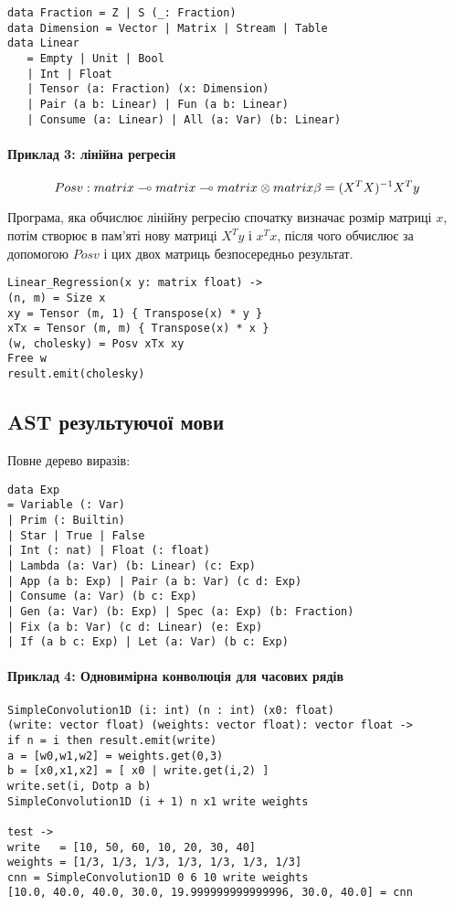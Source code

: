 \documentclass{article}
\begin{document}
\begin{lstlisting}
data Fraction = Z | S (_: Fraction)
data Dimension = Vector | Matrix | Stream | Table
data Linear
   = Empty | Unit | Bool
   | Int | Float
   | Tensor (a: Fraction) (x: Dimension)
   | Pair (a b: Linear) | Fun (a b: Linear)
   | Consume (a: Linear) | All (a: Var) (b: Linear)
\end{lstlisting}

\paragraph{Приклад 3: лінійна регресія}
$$
  Posv : matrix \multimap matrix \multimap matrix \otimes matrix \\
  \beta = (X^TX)^{-1}X^Ty
$$

Програма, яка обчислює лінійну регресію спочатку визначає розмір матриці $x$,
потім створює в пам'яті нову матриці $X^T y$ і $x^Tx$,
після чого обчислює за допомогою $Posv$ і цих двох матриць безпосередньо результат.

\begin{lstlisting}
Linear_Regression(x y: matrix float) ->
(n, m) = Size x
xy = Tensor (m, 1) { Transpose(x) * y }
xTx = Tensor (m, m) { Transpose(x) * x }
(w, cholesky) = Posv xTx xy
Free w
result.emit(cholesky)
\end{lstlisting}

\subsection{AST результуючої мови}
Повне дерево виразів:
\begin{lstlisting}
data Exp
= Variable (: Var)
| Prim (: Builtin)
| Star | True | False
| Int (: nat) | Float (: float)
| Lambda (a: Var) (b: Linear) (c: Exp)
| App (a b: Exp) | Pair (a b: Var) (c d: Exp)
| Consume (a: Var) (b c: Exp)
| Gen (a: Var) (b: Exp) | Spec (a: Exp) (b: Fraction)
| Fix (a b: Var) (c d: Linear) (e: Exp)
| If (a b c: Exp) | Let (a: Var) (b c: Exp)
\end{lstlisting}

\paragraph{Приклад 4: Одновимірна конволюція для часових рядів}
\begin{lstlisting}
SimpleConvolution1D (i: int) (n : int) (x0: float)
(write: vector float) (weights: vector float): vector float ->
if n = i then result.emit(write)
a = [w0,w1,w2] = weights.get(0,3)
b = [x0,x1,x2] = [ x0 | write.get(i,2) ]
write.set(i, Dotp a b)
SimpleConvolution1D (i + 1) n x1 write weights

test ->
write   = [10, 50, 60, 10, 20, 30, 40]
weights = [1/3, 1/3, 1/3, 1/3, 1/3, 1/3, 1/3]
cnn = SimpleConvolution1D 0 6 10 write weights
[10.0, 40.0, 40.0, 30.0, 19.999999999999996, 30.0, 40.0] = cnn
\end{lstlisting}
\end{document}
